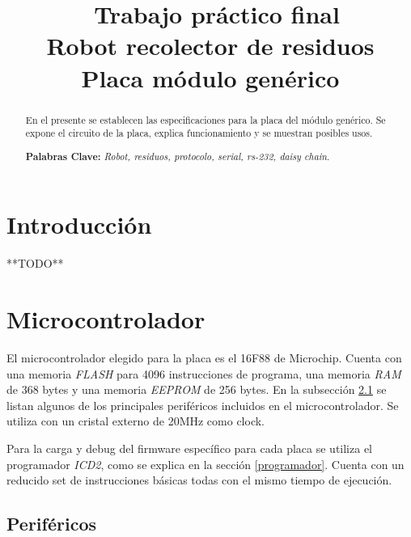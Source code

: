 \documentclass[a4paper,10pt]{article}
\begin{document}
\title{{\ Trabajo pr\'actico final \\ Robot recolector de residuos \\ Placa m\'odulo gen\'erico}}



\maketitle

\begin{abstract}
En el presente se establecen las especificaciones para la placa del m\'odulo gen\'erico.
Se expone el circuito de la placa, explica funcionamiento y se muestran posibles usos.

\textbf{Palabras Clave: }\emph{Robot, residuos, protocolo, serial, rs-232, daisy chain}.
\end{abstract}



\section{Introducci\'on}
\label{introduccion}

**TODO**

\section{Microcontrolador}
\label{microcontrolado}

El microcontrolador elegido para la placa es el 16F88 de Microchip.
Cuenta con una memoria \emph{FLASH} para 4096 instrucciones de programa, una memoria \emph{RAM} de 368 bytes y una memoria \emph{EEPROM} de 256 bytes.
En la subsecci\'on \ref{perifericos} se listan algunos de los principales perif\'ericos incluidos en el microcontrolador.
Se utiliza con un cristal externo de 20MHz como clock.

Para la carga y debug del firmware espec\'ifico para cada placa se utiliza el programador \emph{ICD2}, como se explica en la secci\'on \ref{programador}.
Cuenta con un reducido set de instrucciones b\'asicas todas con el mismo tiempo de ejecuci\'on.

\subsection{Perif\'ericos}
\label{perifericos}
\end{document}
